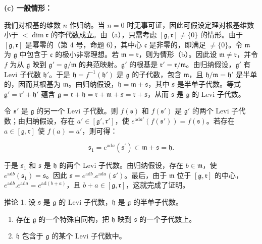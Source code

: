 \textbf{(c) 一般情形：}

我们对根基的维数 \(n\) 作归纳。当 \(n = 0\) 时无事可证，因此可假设定理对根基维数小于 \(<\dim \mathfrak{r}\) 的李代数成立。由（a），只需考虑 \([\mathfrak{g}, \mathfrak{r}] \neq \{0\}\) 的情形。由于 \([\mathfrak{g}, \mathfrak{r}]\) 是幂零的（第 4 号，命题 6），其中心 \(\mathfrak{c}\) 是非零的，即满足 \(\neq \{0\}\)。令 \(\mathfrak{m}\) 为 \(\mathfrak{g}\) 中包含于 \(\mathfrak{c}\) 的极小非零理想。若 \(\mathfrak{m} = \mathfrak{r}\)，则为情形（b）。因此设 \(\mathfrak{m} \neq \mathfrak{r}\)，并令 \(f\) 为从 \(\mathfrak{g}\) 映到 \(\mathfrak{g}' = \mathfrak{g}/\mathfrak{m}\) 的典范映射。\(\mathfrak{g}'\) 的根基是 \(\mathfrak{r}' = \mathfrak{r}/\mathfrak{m}\)。由归纳假设，\(\mathfrak{g}'\) 有 Levi 子代数 \(\mathfrak{h}'\)。于是 \(\mathfrak{h} = f^{-1}(\mathfrak{h}')\) 是 \(\mathfrak{g}\) 的子代数，包含 \(\mathfrak{m}\)，且 \(\mathfrak{h}/\mathfrak{m} = \mathfrak{h}'\) 是半单的，因而其根基为 \(\mathfrak{m}\)。由归纳假设，\(\mathfrak{h} = \mathfrak{m} + \mathfrak{s}\)，其中 \(\mathfrak{s}\) 是半单子代数。等式 \(\mathfrak{g}' = \mathfrak{r}' + \mathfrak{h}'\) 蕴含 \(\mathfrak{g} = \mathfrak{r} + \mathfrak{h} = \mathfrak{r} + \mathfrak{m} + \mathfrak{s} = \mathfrak{r} + \mathfrak{s}\)，从而 \(\mathfrak{s}\) 是 \(\mathfrak{g}\) 的 Levi 子代数。

令 \(\mathfrak{s}'\) 是 \(\mathfrak{g}\) 的另一个 Levi 子代数。则 \(f(\mathfrak{s})\) 和 \(f(\mathfrak{s}')\) 是 \(\mathfrak{g}'\) 的两个 Levi 子代数；由归纳假设，存在 \(a' \in [\mathfrak{g}', \mathfrak{r}']\)，使 \(e^{\mathrm{ad} a'}(f(\mathfrak{s}')) = f(\mathfrak{s})\)。若存在 \(a \in [\mathfrak{g}, \mathfrak{r}]\) 使 \(f(a) = a'\)，则可得：

\[
\mathfrak {s} _ {1} = e ^ {\mathrm{ad} a} \left(\mathfrak {s} ^ {\prime}\right) \subset \mathfrak {m} + \mathfrak {s} = \mathfrak {h}.
\]

于是 \(\mathfrak{s}_1\) 和 \(\mathfrak{s}\) 是 \(\mathfrak{h}\) 的两个 Levi 子代数。由归纳假设，存在 \(b\in \mathfrak{m}\)，使 \(e^{\mathrm{ad}b}(\mathfrak{s}_1) = \mathfrak{s}\)。因此 \(\mathfrak{s} = e^{\mathrm{ad}b}.e^{\mathrm{ad}a}(\mathfrak{s}')\)。最后，由于 \(\mathfrak{m}\) 位于 \([\mathfrak{g},\mathfrak{r}]\) 的中心，\(e^{\mathrm{ad}b}.e^{\mathrm{ad}a} = e^{\mathrm{ad}(b + a)}\)，且 \(b + a\in [\mathfrak{g},\mathfrak{r}]\)，这就完成了证明。

推论 1. 设 \(\mathfrak{s}\) 是 \(\mathfrak{g}\) 的 Levi 子代数，\(\mathfrak{h}\) 是 \(\mathfrak{g}\) 的半单子代数。

\begin{enumerate}
\def\labelenumi{(\alph{enumi})}
\item
  存在 \(\mathfrak{g}\) 的一个特殊自同构，把 \(\mathfrak{h}\) 映到 \(\mathfrak{s}\) 的一个子代数上。
\item
  \(\mathfrak{h}\) 包含于 \(\mathfrak{g}\) 的某个 Levi 子代数中。
\end{enumerate}

